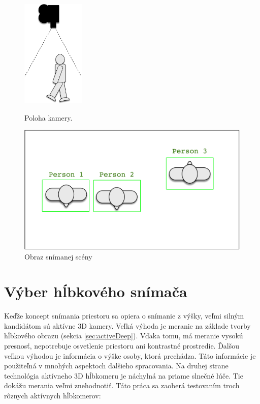 \begin{figure}[H]
    \centering
    \begin{minipage}[p]{0.49\textwidth}
        \centering
        \includegraphics[width=3cm]{images/conceptCameraPos}
        \caption{Poloha kamery.}
    \end{minipage}
    \hfill
    \begin{minipage}[p]{0.49\textwidth}
        \centering
        \includegraphics[width=\textwidth]{images/conturesConcept}
        \caption{Obraz snímanej scény}
    \end{minipage}
\end{figure}


\section{Výber hĺbkového snímača}
Keďže  koncept snímania priestoru sa opiera o snímanie z výšky, veľmi silným kandidátom sú aktívne 3D kamery. Veľká výhoda je meranie na základe tvorby hĺbkového obrazu (sekcia \ref{sec:activeDeep}). Vďaka tomu, má meranie vysokú presnosť, nepotrebuje osvetlenie priestoru ani kontrastné prostredie.  Ďalšou veľkou výhodou je informácia o výške osoby, ktorá prechádza. Táto informácie je použiteľná v mnohých aspektoch ďalšieho spracovania. Na druhej strane technológia aktívneho 3D hĺbkomeru je náchylná na priame slnečné lúče. Tie dokážu merania veľmi znehodnotiť. Táto práca sa zaoberá testovaním troch rôznych aktívnych hĺbkomerov: 

